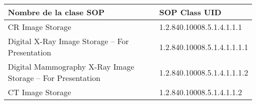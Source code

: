 \begin{tabular}{|l|l|}
\hline
\textbf{Nombre de la clase SOP}                            & \textbf{SOP Class UID}      \\ \hline
CR Image Storage                                           & 1.2.840.10008.5.1.4.1.1.1   \\ \hline
Digital X-Ray Image Storage – For Presentation             & 1.2.840.10008.5.1.4.1.1.1.1 \\ \hline
Digital Mammography X-Ray Image Storage – For Presentation & 1.2.840.10008.5.1.4.1.1.1.2 \\ \hline
CT Image Storage                                           & 1.2.840.10008.5.1.4.1.1.2   \\ \hline
\end{tabular}

